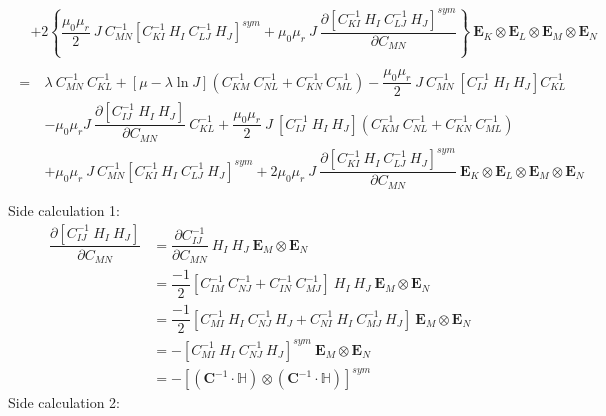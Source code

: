 \documentclass[11pt,a4paper,final]{article}
\begin{document}
\begin{align*}
\begin{split}
&+ 2 \left\lbrace \dfrac{\mu_0 \mu_r}{2} \ J \ C^{-1}_{MN} [C^{-1}_{KI} \ H_I \ C^{-1}_{LJ} \ H_J]^{sym} + \mu_0 \mu_r \ J \ \dfrac{\partial [C^{-1}_{KI} \ H_I \ C^{-1}_{LJ} \ H_J]^{sym}}{\partial C_{MN}} \right\rbrace \ \mathbf{E}_K \otimes \mathbf{E}_L \otimes \mathbf{E}_M \otimes \mathbf{E}_N
\end{split}\\
\begin{split}
=\ & \lambda \ C^{-1}_{MN} \ C^{-1}_{KL} + [\mu - \lambda \ln J] \left( C^{-1}_{KM} \ C^{-1}_{NL} + C^{-1}_{KN} \ C^{-1}_{ML} \right) - \dfrac{\mu_0 \mu_r}{2} \ J \ C^{-1}_{MN} \ [C^{-1}_{IJ} \ H_I \ H_J] C^{-1}_{KL} \\
&- \mu_0 \mu_r J \ \dfrac{\partial [C^{-1}_{IJ} \ H_I \ H_J]}{\partial C_{MN}} \ C^{-1}_{KL} + \dfrac{\mu_0 \mu_r}{2} \ J \ [C^{-1}_{IJ} \ H_I \ H_J] (C^{-1}_{KM} \ C^{-1}_{NL} + C^{-1}_{KN} \ C^{-1}_{ML}) \\
&+ \mu_0 \mu_r \ J \ C^{-1}_{MN} [C^{-1}_{KI} \ H_I \ C^{-1}_{LJ} \ H_J]^{sym} + 2 \mu_0 \mu_r \ J \ \dfrac{\partial [C^{-1}_{KI} \ H_I \ C^{-1}_{LJ} \ H_J]^{sym}}{\partial C_{MN}} \ \mathbf{E}_K \otimes \mathbf{E}_L \otimes \mathbf{E}_M \otimes \mathbf{E}_N
\end{split}\\
\end{align*}
\newline
Side calculation 1:
\begin{align*}
\dfrac{\partial [C^{-1}_{IJ} \ H_I \ H_J]}{\partial C_{MN}} &= \dfrac{\partial C^{-1}_{IJ}}{\partial C_{MN}} \ H_I \ H_J \ \mathbf{E}_M \otimes \mathbf{E}_N \\
&= \dfrac{-1}{2} [C^{-1}_{IM} \ C^{-1}_{NJ} + C^{-1}_{IN} \ C^{-1}_{MJ}] \ H_I \ H_J \ \mathbf{E}_M \otimes \mathbf{E}_N \\
&= \dfrac{-1}{2} [C^{-1}_{MI} \ H_I \ C^{-1}_{NJ} \ H_J + C^{-1}_{NI} \ H_I \ C^{-1}_{MJ} \ H_J] \ \mathbf{E}_M \otimes \mathbf{E}_N \\
&= - [C^{-1}_{MI} \ H_I \ C^{-1}_{NJ} \ H_J]^{sym} \ \mathbf{E}_M \otimes \mathbf{E}_N \\
&= - [ (\mathbf{C}^{-1} \cdot \mathbb{H}) \otimes (\mathbf{C}^{-1} \cdot \mathbb{H}) ]^{sym}
\end{align*}
Side calculation 2:
\end{document}
